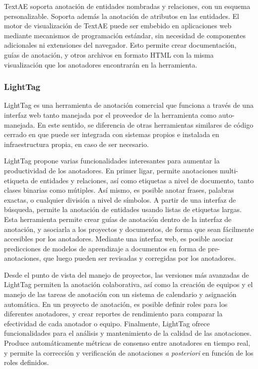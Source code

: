 TextAE soporta anotación de entidades nombradas y relaciones, con un esquema personalizable.
Soporta además la anotación de atributos en las entidades.
El motor de visualización de TextAE puede ser embebido en aplicaciones web mediante mecanismos de programación estándar, sin necesidad de componentes adicionales ni extensiones del navegador.
Esto permite crear documentación, guías de anotación, y otros archivos en formato HTML con la misma visualización que los anotadores encontrarán en la herramienta.

\subsubsection*{LightTag}

LightTag es una herramienta de anotación comercial que funciona a través de una interfaz web tanto manejada por el proveedor de la herramienta como auto-manejada.
En este sentido, se diferencia de otras herramientas similares de código cerrado en que puede ser integrada con sistemas propios e instalada en infraestructura propia, en caso de ser necesario.

LightTag propone varias funcionalidades interesantes para aumentar la productividad de los anotadores.
En primer ligar, permite anotaciones multi-etiqueta de entidades y relaciones, así como etiquetas a nivel de documento, tanto clases binarias como mútiples.
Así mismo, es posible anotar frases, palabras exactas, o cualquier división a nivel de símbolos.
A partir de una interfaz de búsqueda, permite la anotación de entidades usando listas de etiquetas largas.
Esta herramienta permite crear guías de anotación dentro de la interfaz de anotación, y asociarla a los proyectos y documentos, de forma que sean fácilmente accesibles por los anotadores.
Mediante una interfaz web, es posible asociar predicciones de modelos de aprendizaje a documentos en forma de pre-anotaciones, que luego pueden ser revisadas y corregidas por los anotadores.

Desde el punto de vista del manejo de proyectos, las versiones más avanzadas de LightTag permiten la anotación colaborativa, así como la creación de equipos y el manejo de las tareas de anotación con un sistema de calendario y asignación automática.
En un proyecto de anotación, es posible definir roles para los diferentes anotadores, y crear reportes de rendimiento para comparar la efectividad de cada anotador o equipo.
Finalmente, LightTag ofrece funcionalidades para el análisis y mantenimiento de la calidad de las anotaciones.
Produce automáticamente métricas de consenso entre anotadores en tiempo real, y permite la corrección y verificación de anotaciones \textit{a posteriori} en función de los roles definidos.

